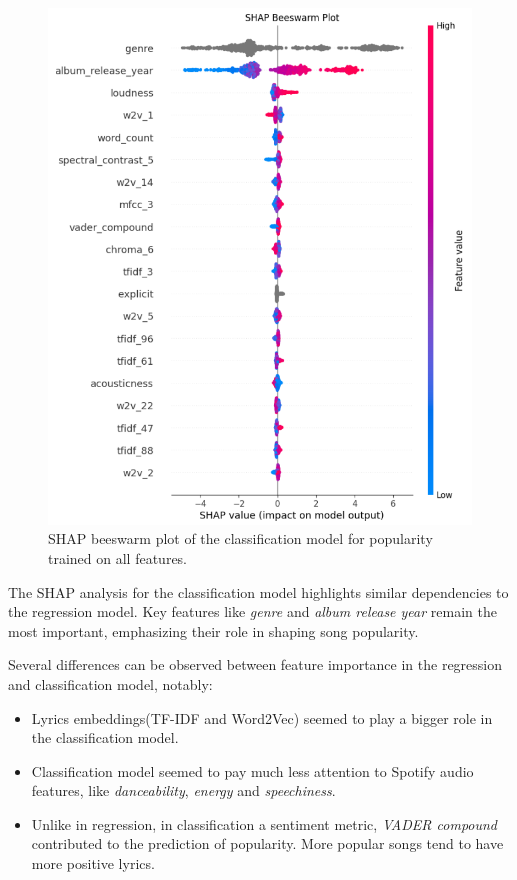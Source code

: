\begin{center}
\begin{figure}[H]
  \centering
  \includegraphics[width=5in]{img/beeswarm_popularity_clf.png}
  \caption{SHAP beeswarm plot of the classification model for popularity trained on all features.}
  \label{Figure:fig_beh}
\end{figure}
\end{center}



The SHAP analysis for the classification model highlights similar dependencies
to the regression model. Key features like \textit{genre} and
\textit{album release year} remain the most important, emphasizing their role
in shaping song popularity. 

Several differences can be observed between feature importance in the
regression and classification model, notably:
\begin{itemize}
  \item Lyrics embeddings(TF-IDF and Word2Vec) seemed to play a bigger role in
    the classification model.
  \item Classification model seemed to pay much less attention to Spotify audio
    features, like \textit{danceability}, \textit{energy} and
    \textit{speechiness}.
  \item Unlike in regression, in classification a sentiment metric,
    \textit{VADER compound} contributed to the prediction of popularity. More
    popular songs tend to have more positive lyrics.
\end{itemize}


